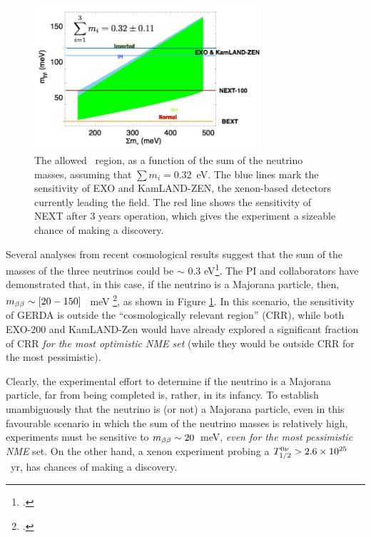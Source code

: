 \begin{figure}
\centering
\includegraphics[width=0.75\textwidth]{img/SensiCRR.png}
\caption{The allowed \mbb\ region, as a function of the sum of the neutrino masses, assuming that 
$\sum m_i = 0.32$~eV. The blue lines mark the sensitivity of EXO and KamLAND-ZEN, the xenon-based detectors currently leading the field. The red line shows the sensitivity of NEXT after 3 years operation, which gives the experiment a sizeable chance of making a discovery.} 
\label{fig.mbb}
\end{figure}

 Several analyses from recent cosmological results suggest that the sum of the masses of the three neutrinos could be $\sim$ 0.3 eV\footcite{PhysRevLett.112.051303}. The PI and collaborators have demonstrated that, in this case, if the neutrino is a Majorana particle, then, $m_{\beta\beta} \sim [20-150]$~ meV \footcite{GomezCadenas:2013ue}, as shown in Figure \ref{fig.mbb}. In this scenario, the sensitivity of GERDA is outside the ``cosmologically relevant region'' (CRR), while both EXO-200 and KamLAND-Zen would have already explored a significant fraction of CRR {\em for the most optimistic NME set} (while they would be outside CRR for the most pessimistic). 
 
 Clearly, the experimental effort to determine if the neutrino is a Majorana particle, far from being completed is, rather, in its infancy. To establish unambiguously that the neutrino is (or not) a Majorana particle, even in this favourable scenario in which the sum of the neutrino masses is relatively high, experiments must be sensitive to $m_{\beta\beta} \sim 20$~meV, {\em even for the most pessimistic NME} set. On the other hand, a xenon experiment probing a $T_{1/2}^{0\nu} >2.6 \times 10^{25}$~yr, has chances of making a discovery.
 
 
